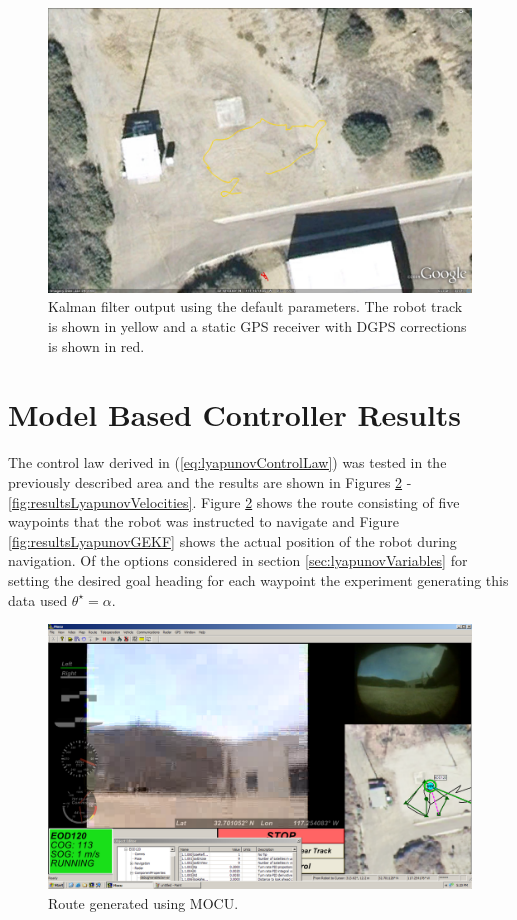 \begin{figure}[ht!]
	\centering
	\includegraphics[width=.95\textwidth]{images/kfPlainDataFirstAttempt}
	\caption{Kalman filter output using the default parameters. The robot track is shown in yellow and a static GPS receiver with DGPS corrections is shown in red.}
	\label{fig:kfPlainDataFirstAttempt}
\end{figure}

\section{Model Based Controller Results}
\label{sec:lyapunovResults}
The control law derived in (\ref{eq:lyapunovControlLaw}) was tested in the previously described area and the results are shown in Figures \ref{fig:resultsLyapunovMocu} - \ref{fig:resultsLyapunovVelocities}. Figure \ref{fig:resultsLyapunovMocu} shows the route consisting of five waypoints that the robot was instructed to navigate and Figure \ref{fig:resultsLyapunovGEKF} shows the actual position of the robot during navigation. Of the options considered in section \ref{sec:lyapunovVariables} for setting the desired goal heading for each waypoint the experiment generating this data used $\theta^\star=\alpha$.

\begin{figure}[ht!]
	\centering
	\includegraphics[width=.5\textwidth]{images/20100918_1717_mocu}
	\caption{Route generated using MOCU.}
	\label{fig:resultsLyapunovMocu}
\end{figure}

